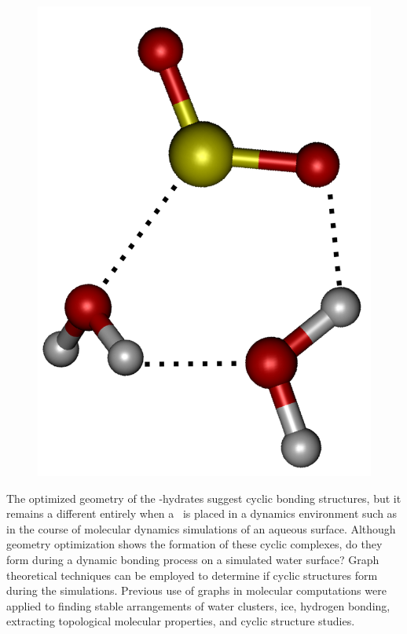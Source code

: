 \begin{figure}[h!]
	\begin{center}
		\includegraphics[scale=1.0]{images/cycles/double-cycle-type2-small.png}
		\caption{}
		\label{fig:cyclic-example}
	\end{center}
\end{figure}

The optimized geometry of the \suldiox-hydrates suggest cyclic bonding structures, but it remains a different entirely when a \suldiox~is placed in a dynamics environment such as in the course of molecular dynamics simulations of an aqueous surface. Although geometry optimization shows the formation of these cyclic complexes, do they form during a dynamic bonding process on a simulated water surface? Graph theoretical techniques can be employed to determine if cyclic structures form during the simulations. Previous use of graphs in molecular computations were applied to finding stable arrangements of water clusters, ice, hydrogen bonding, extracting topological molecular properties, and cyclic structure studies.\cite{Anick2002, Huber2007, Radhakrishnan1991, Shi2005, Garcia2004, McDonald1998}

